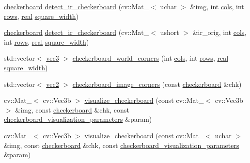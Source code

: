 \begin{DoxyCompactItemize}
\item 
\hyperlink{structtlz_1_1checkerboard}{checkerboard} \hyperlink{namespacetlz_abc33c7b74cbbd686b06228c1fdad9214}{detect\+\_\+ir\+\_\+checkerboard} (cv\+::\+Mat\+\_\+$<$ uchar $>$ \&img, int \hyperlink{checkerboard__samples_8cc_a4407a60bc4387adae24cee658711f2d9}{cols}, int \hyperlink{checkerboard__samples_8cc_a061459acc9e078fa4699e0e349887215}{rows}, \hyperlink{namespacetlz_a15fd37cce97f2b8b606af18c2615f602}{real} \hyperlink{checkerboard__samples_8cc_ac9c5e9ae84febda1283c11202619c086}{square\+\_\+width})
\item 
\hyperlink{structtlz_1_1checkerboard}{checkerboard} \hyperlink{namespacetlz_a44d7b1eca8ce426dd5e6761ab8a7f832}{detect\+\_\+ir\+\_\+checkerboard} (cv\+::\+Mat\+\_\+$<$ ushort $>$ \&ir\+\_\+orig, int \hyperlink{checkerboard__samples_8cc_a4407a60bc4387adae24cee658711f2d9}{cols}, int \hyperlink{checkerboard__samples_8cc_a061459acc9e078fa4699e0e349887215}{rows}, \hyperlink{namespacetlz_a15fd37cce97f2b8b606af18c2615f602}{real} \hyperlink{checkerboard__samples_8cc_ac9c5e9ae84febda1283c11202619c086}{square\+\_\+width})
\item 
std\+::vector$<$ \hyperlink{namespacetlz_ad0646d752ddb9d40d702d40cc6dc54a1}{vec3} $>$ \hyperlink{namespacetlz_acc37da60bde41595da4139110c2d36e6}{checkerboard\+\_\+world\+\_\+corners} (int \hyperlink{checkerboard__samples_8cc_a4407a60bc4387adae24cee658711f2d9}{cols}, int \hyperlink{checkerboard__samples_8cc_a061459acc9e078fa4699e0e349887215}{rows}, \hyperlink{namespacetlz_a15fd37cce97f2b8b606af18c2615f602}{real} \hyperlink{checkerboard__samples_8cc_ac9c5e9ae84febda1283c11202619c086}{square\+\_\+width})
\item 
std\+::vector$<$ \hyperlink{namespacetlz_ae192989bfbe6c700ac84d2a8cf05ebb4}{vec2} $>$ \hyperlink{namespacetlz_a6693dca816d6f48429d1c607ced26f3b}{checkerboard\+\_\+image\+\_\+corners} (const \hyperlink{structtlz_1_1checkerboard}{checkerboard} \&chk)
\item 
cv\+::\+Mat\+\_\+$<$ cv\+::\+Vec3b $>$ \hyperlink{namespacetlz_a0ae3b183b2bd5a5074615f7eb2b7677d}{visualize\+\_\+checkerboard} (const cv\+::\+Mat\+\_\+$<$ cv\+::\+Vec3b $>$ \&img, const \hyperlink{structtlz_1_1checkerboard}{checkerboard} \&chk, const \hyperlink{structtlz_1_1checkerboard__visualization__parameters}{checkerboard\+\_\+visualization\+\_\+parameters} \&param)
\item 
cv\+::\+Mat\+\_\+$<$ cv\+::\+Vec3b $>$ \hyperlink{namespacetlz_af6edf796bfd0c3be17266982632b8e28}{visualize\+\_\+checkerboard} (const cv\+::\+Mat\+\_\+$<$ uchar $>$ \&img, const \hyperlink{structtlz_1_1checkerboard}{checkerboard} \&chk, const \hyperlink{structtlz_1_1checkerboard__visualization__parameters}{checkerboard\+\_\+visualization\+\_\+parameters} \&param)

\end{DoxyCompactItemize}
